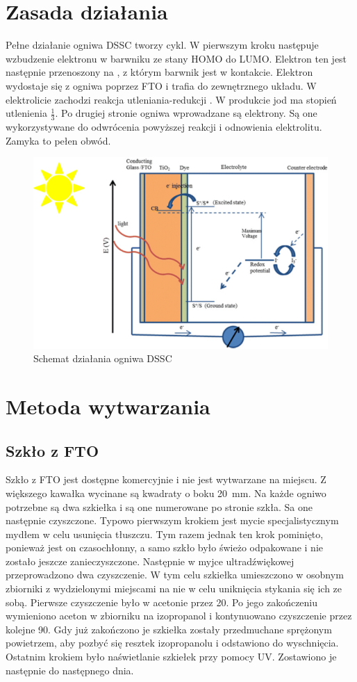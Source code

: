 \documentclass[12pt]{article}
\begin{document}
	\section{Zasada działania}
	Pełne działanie ogniwa DSSC tworzy cykl. W pierwszym kroku następuje wzbudzenie elektronu w barwniku ze stany HOMO do LUMO. Elektron ten jest następnie przenoszony na , z którym barwnik jest w kontakcie. Elektron wydostaje się z ogniwa poprzez FTO i trafia do zewnętrznego układu. W elektrolicie zachodzi reakcja utleniania-redukcji . W produkcie jod ma stopień utlenienia $\frac{1}{3}$. Po drugiej stronie ogniwa wprowadzane są elektrony. Są one wykorzystywane do odwrócenia powyższej reakcji i odnowienia elektrolitu. Zamyka to pełen obwód. 
	\begin{figure}[H]
		\centering
		\includegraphics[width=\textwidth]{dssc.png}
		\caption{Schemat działania ogniwa DSSC \cite{dssc;fundamentals}}
	\end{figure}
	
	\section{Metoda wytwarzania}
	\subsection{Szkło z FTO}
	Szkło z FTO jest dostępne komercyjnie i nie jest wytwarzane na miejscu. Z większego kawałka wycinane są kwadraty o boku \qty{20}{\mm}. Na każde ogniwo potrzebne są dwa szkiełka i są one numerowane po stronie szkła. Sa one następnie czyszczone. Typowo pierwszym krokiem jest mycie specjalistycznym mydłem w celu usunięcia tłuszczu. Tym razem jednak ten krok pominięto, ponieważ jest on czasochłonny, a samo szkło było świeżo odpakowane i nie zostało jeszcze zanieczyszczone. Następnie w myjce ultradźwiękowej przeprowadzono dwa czyszczenie. W tym celu szkiełka umieszczono w osobnym zbiorniki z wydzielonymi miejscami na nie w celu uniknięcia stykania się ich ze sobą. Pierwsze czyszczenie było w acetonie przez \qty{20}{\min}. Po jego zakończeniu wymieniono aceton w zbiorniku na izopropanol i kontynuowano czyszczenie przez kolejne \qty{90}{\min}. Gdy już zakończono je szkiełka zostały przedmuchane sprężonym powietrzem, aby pozbyć się resztek izopropanolu i odstawiono do wyschnięcia. Ostatnim krokiem było naświetlanie szkiełek przy pomocy UV. Zostawiono je następnie do następnego dnia. 
	
\end{document}
